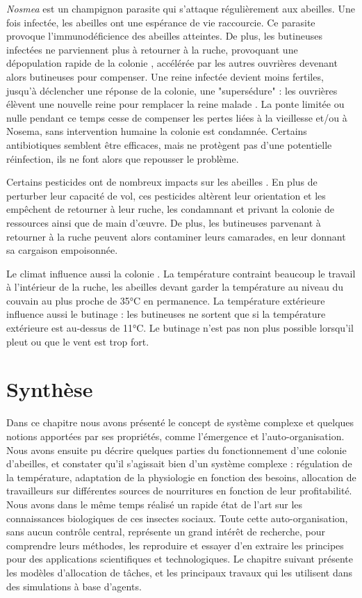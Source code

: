 		\textit{Nosmea} est un champignon parasite qui s'attaque régulièrement aux abeilles. Une fois infectée, les abeilles ont une espérance de vie raccourcie. Ce parasite provoque l'immunodéficience des abeilles atteintes. De plus, les butineuses infectées ne parviennent plus à retourner à la ruche, provoquant une dépopulation rapide de la colonie \cite{higes_how_2008}, accélérée par les autres ouvrières devenant alors butineuses pour compenser. Une reine infectée devient moins fertiles, jusqu'à déclencher une réponse de la colonie, une "supersédure" : les ouvrières élèvent une nouvelle reine pour remplacer la reine malade \cite{alaux_pathological_2011}. La ponte limitée ou nulle pendant ce temps cesse de compenser les pertes liées à la vieillesse et/ou à Nosema, sans intervention humaine la colonie est condamnée. Certains antibiotiques semblent être efficaces, mais ne protègent pas d'une potentielle réinfection, ils ne font alors que repousser le problème.
		
		Certains pesticides ont de nombreux impacts sur les abeilles \cite{betti_bee_2017}. En plus de perturber leur capacité de vol, ces pesticides altèrent leur orientation et les empêchent de retourner à leur ruche, les condamnant et privant la colonie de ressources ainsi que de main d'œuvre. De plus, les butineuses parvenant à retourner à la ruche peuvent alors contaminer leurs camarades, en leur donnant sa cargaison empoisonnée.
		
		Le climat influence aussi la colonie \cite{riviere_toward_2018}. La température contraint beaucoup le travail à l'intérieur de la ruche, les abeilles devant garder la température au niveau du couvain au plus proche de 35°C en permanence. La température extérieure influence aussi le butinage : les butineuses ne sortent que si la température extérieure est au-dessus de 11°C. Le butinage n'est pas non plus possible lorsqu'il pleut ou que le vent est trop fort.
		
			
			
		\section*{Synthèse}
			
		Dans ce chapitre nous avons présenté le concept de système complexe et quelques notions apportées par ses propriétés, comme l'émergence et l'auto-organisation. Nous avons ensuite pu décrire quelques parties du fonctionnement d'une colonie d'abeilles, et constater qu'il s'agissait bien d'un système complexe : régulation de la température, adaptation de la physiologie en fonction des besoins, allocation de travailleurs sur différentes sources de nourritures en fonction de leur profitabilité. Nous avons dans le même temps réalisé un rapide état de l'art sur les connaissances biologiques de ces insectes sociaux. Toute cette auto-organisation, sans aucun contrôle central, représente un grand intérêt de recherche, pour comprendre leurs méthodes, les reproduire et essayer d'en extraire les principes pour des applications scientifiques et technologiques. Le chapitre suivant présente les modèles d'allocation de tâches, et les principaux travaux qui les utilisent dans des simulations à base d'agents.